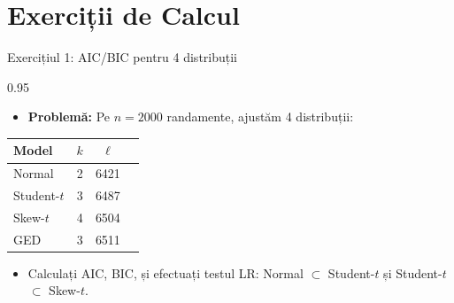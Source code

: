 \documentclass[9pt, aspectratio=169, t]{beamer}
\begin{document}
\section{Exerciții de Calcul}

\begin{frame}{Exercițiul 1: AIC/BIC pentru 4 distribuții}
    \begin{cminipage}{0.95\textwidth}
    \begin{itemize}\setlength{\itemsep}{0pt}
        \item \textbf{Problemă:} Pe $n = 2000$ randamente, ajustăm 4 distribuții:
    \end{itemize}

    \renewcommand{\arraystretch}{1.2}
    \begin{center}
    \begin{tabular}{lccc}
    \toprule
    \textbf{Model} & $k$ & $\ell$ & \\
    \midrule
    Normal & 2 & 6421 & \\
    Student-$t$ & 3 & 6487 & \\
    Skew-$t$ & 4 & 6504 & \\
    GED & 3 & 6511 & \\
    \bottomrule
    \end{tabular}
    \end{center}

    \begin{itemize}\setlength{\itemsep}{0pt}
        \item Calculați AIC, BIC, și efectuați testul LR: Normal $\subset$ Student-$t$ și Student-$t$ $\subset$ Skew-$t$.
    \end{itemize}
    \end{cminipage}
\end{frame}
\end{document}
